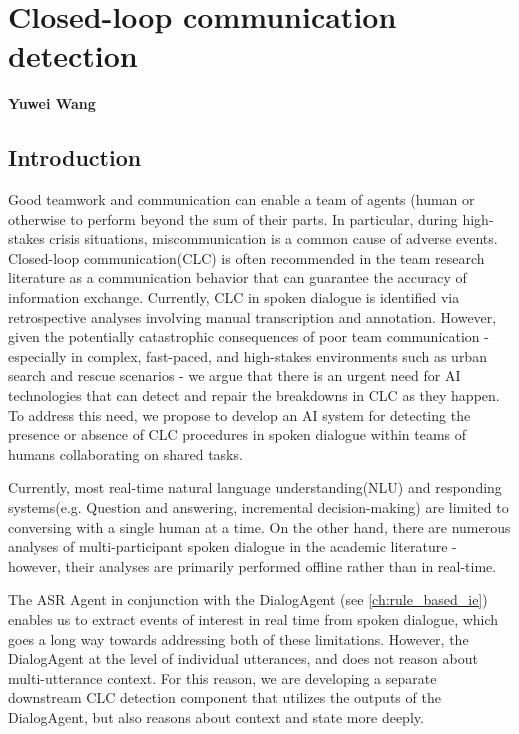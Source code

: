 \chapter{Closed-loop communication detection}
\label{ch:clc}
\textbf{Yuwei Wang}

\section{Introduction}

Good teamwork and communication can enable a team of agents (human or otherwise
to perform beyond the sum of their parts\citep{roberts2022state}. In particular, 
during high-stakes crisis situations, miscommunication is a common cause of
adverse events\citep{taylor2014description,davis2017operative}. Closed-loop
communication(CLC) is often recommended in the team research literature
as a communication behavior that can guarantee the accuracy of information
exchange\citep{marzuki2019closed}. Currently, CLC in spoken dialogue is
identified via retrospective analyses involving manual transcription and
annotation. However, given the potentially catastrophic consequences of poor
team communication\citep{flin2004identifying} - especially in complex,
fast-paced, and high-stakes environments such as urban search and rescue
scenarios - we argue that there is an urgent need for AI technologies that can
detect and repair the breakdowns in CLC as they happen. To address this need,
we propose to develop an AI system for detecting the presence or absence of CLC
procedures in spoken dialogue within teams of humans collaborating on shared
tasks.

Currently, most real-time natural language understanding(NLU) and responding systems(e.g. Question and
answering\citep{hawkins2017you}, incremental
decision-making\citep{devault2011detecting}) are limited to conversing with a
single human at a time. On the other hand, there are numerous analyses of
multi-participant spoken dialogue in the academic literature - however, their
analyses are primarily performed offline rather than in real-time. 

The ASR Agent in conjunction with the DialogAgent (see \autoref{ch:rule_based_ie})
enables us to extract events of interest in real time from spoken dialogue,
which goes a long way towards addressing both of these limitations. However,
the DialogAgent at the level of individual utterances, and does not reason
about multi-utterance context. For this reason, we are developing a separate downstream
CLC detection component that utilizes the outputs of the DialogAgent, but also
reasons about context and state more deeply.


